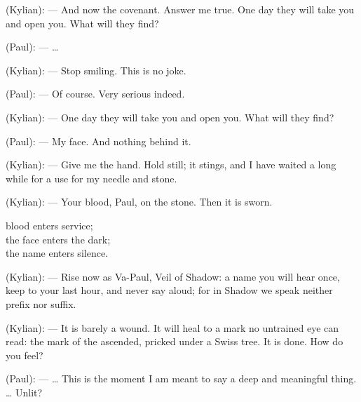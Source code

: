 \begin{room}
(Kylian): --- And now the covenant. Answer me true. One day they will take you and open you. What will they find?

(Paul): --- \ldots{}

(Kylian): --- Stop smiling. This is no joke.

(Paul): --- Of course. Very serious indeed.

(Kylian): --- One day they will take you and open you. What will they find?

(Paul): --- My face. And nothing behind it.

(Kylian): --- Give me the hand. Hold still; it stings, and I have waited a long while for a use for my needle and stone.

\centerline{}

(Kylian): --- Your blood, Paul, on the stone. Then it is sworn.

\begin{scripture}
blood enters service; \\
the face enters the dark; \\
the name enters silence.
\end{scripture}

(Kylian): --- Rise now as Va-Paul, Veil of Shadow: a name you will hear once, keep to your last hour, and never say aloud; for in Shadow we speak neither prefix nor suffix.

\centerline{}

(Kylian): --- It is barely a wound. It will heal to a mark no untrained eye can read: the mark of the ascended, pricked under a Swiss tree. It is done. How do you feel?

(Paul): --- \ldots{} This is the moment I am meant to say a deep and meaningful thing. \ldots{} Unlit?

\end{room}
